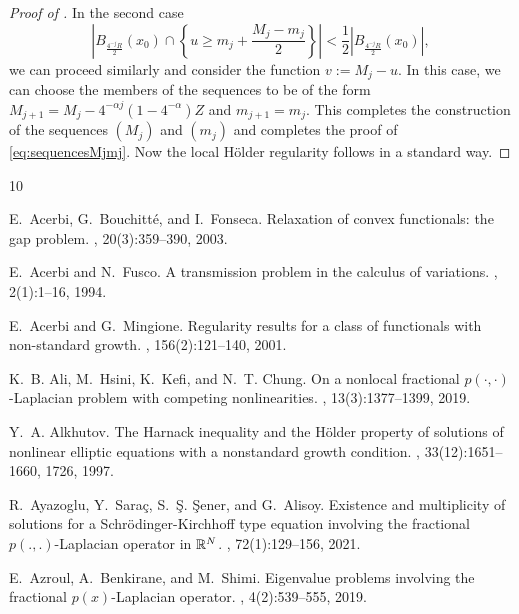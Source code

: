 \documentclass[11pt]{amsart}
\theoremstyle{plain}
\theoremstyle{definition}
\numberwithin{equation}{section}
\begin{document}
\begin{proof} [Proof of ]
In the second case
\[ \left| B_{\frac{4^{-j}R}{2}}(x_0) \cap \left\{ u\geq m_{j} + \frac{M_j-m_j}{2} \right\} \right| < \frac{1}{2}\left| B_{\frac{4^{-j}R}{2}}(x_0) \right|, \]
we can proceed similarly and consider the function $v:=M_j-u$. In this case, we can choose the members of the sequences to be of the form $M_{j+1} = M_j-4^{-\alpha j}(1-4^{-\alpha})Z$ and $m_{j+1}=m_j$. This completes the construction of the sequences $(M_j)$ and $(m_j)$ and completes the proof of \eqref{eq:sequencesMjmj}. Now the local Hölder regularity follows in a standard way.
\end{proof}




%
%

\begin{thebibliography}{10}

E.~Acerbi, G.~Bouchitt\'{e}, and I.~Fonseca.
\newblock Relaxation of convex functionals: the gap problem.
,
  20(3):359--390, 2003.

E.~Acerbi and N.~Fusco.
\newblock A transmission problem in the calculus of variations.
, 2(1):1--16, 1994.

E.~Acerbi and G.~Mingione.
\newblock Regularity results for a class of functionals with non-standard
  growth.
, 156(2):121--140, 2001.

K.~B. Ali, M.~Hsini, K.~Kefi, and N.~T. Chung.
\newblock On a nonlocal fractional {$p(\cdot,\cdot)$}-{L}aplacian problem with
  competing nonlinearities.
, 13(3):1377--1399, 2019.

Y.~A. Alkhutov.
\newblock The {H}arnack inequality and the {H}\"{o}lder property of solutions
  of nonlinear elliptic equations with a nonstandard growth condition.
, 33(12):1651--1660, 1726, 1997.

R.~Ayazoglu, Y.~Sara\c{c}, S.~\c{S}. \c{S}ener, and G.~Alisoy.
\newblock Existence and multiplicity of solutions for a
  {S}chr\"{o}dinger-{K}irchhoff type equation involving the fractional
  {$p(.,.)$}-{L}aplacian operator in {$\Bbb R^N$}.
, 72(1):129--156, 2021.

E.~Azroul, A.~Benkirane, and M.~Shimi.
\newblock Eigenvalue problems involving the fractional {$p(x)$}-{L}aplacian
  operator.
, 4(2):539--555, 2019.


\end{thebibliography}
\end{document}
